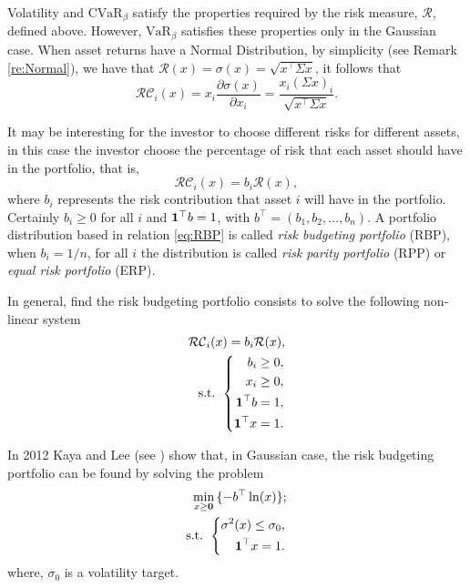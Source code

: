 Volatility and $\mbox{CVaR}_\beta$  satisfy the properties required by the risk measure, $\mathcal{R}$, defined above. However, $\mbox{VaR}_\beta$ satisfies these properties only in the Gaussian case. When asset returns have a Normal Distribution, by simplicity (see Remark \ref{re:Normal}), we have that
$\mathcal{R}(x)=\sigma(x)=\sqrt{x^\top\Sigma x}$, it follows that
\[
\mathcal{RC}_i(x)= x_i \frac{\partial \sigma(x)}{\partial x_i}=\frac{x_i (\Sigma x)_i}{\sqrt{x^\top\Sigma x }}.
\]

It may be interesting for the investor to choose different risks for different assets, in this case the investor choose the percentage of risk that each asset should have in the portfolio, that is,
\begin{equation}\label{eq:RBP}
	\mathcal{RC}_i(x)=b_i\mathcal{R}(x),
\end{equation}
where $b_i$ represents the risk contribution that asset $i$ will have in the portfolio. Certainly $b_i\geq 0$ for all $i$ and
${\bf 1}^\top b =1$, with $b^\top=(b_1, b_2, \dots, b_n)$. A portfolio distribution based in relation \eqref{eq:RBP} is called \textit{risk budgeting portfolio} (RBP), when $b_i=1/n$, for all $i$ the distribution is called \textit{risk parity portfolio} (RPP) or \textit{equal risk portfolio} (ERP).

In general, find the risk budgeting portfolio consists to solve the following non-linear system
\begin{eqnarray}\label{eq:SisNLin}
\mathcal{RC}_i(x)=b_i\mathcal{R}(x), \\
	\mbox{s.t. }\left\{
	\begin{aligned}\nonumber
b_i \geq 0, \\
x_i \geq 0, \\
{\bf 1}^\top b =1, \\
{\bf 1}^\top x =1.
	\end{aligned}
	\right.
\end{eqnarray}

In 2012 Kaya and Lee (see \cite{KayaLee2012}) show that, in Gaussian case, the risk budgeting portfolio can be found by solving the problem
\begin{eqnarray}\label{eq:MinProb}
\min_{x\geq \textbf{0}}\, \{-b^\top \ln(x)\}; \\
	\mbox{s.t. }\left\{
	\begin{aligned}\nonumber
\sigma^2(x)\leq \sigma_0,\\
{\bf 1}^\top x =1.
	\end{aligned}
	\right.
\end{eqnarray}
where, $\sigma_0$ is a volatility target.





